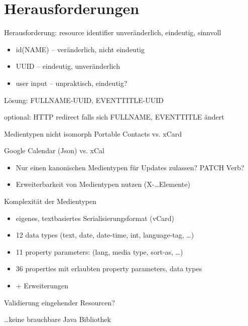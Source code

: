 \documentclass{beamer}
\begin{document}
\section{Herausforderungen}

\begin{frame}{Herausforderung: resource identifier}
  unveränderlich, eindeutig, sinnvoll
  \begin{itemize}
  \item id(NAME) -- veränderlich, nicht eindeutig
  \item UUID -- eindeutig, unveränderlich
  \item user input -- unpraktisch, eindeutig?
  \end{itemize}
  Lösung: FULLNAME-UUID, EVENTTITLE-UUID

  optional: HTTP redirect falls sich FULLNAME, EVENTTITLE ändert
\end{frame}

\begin{frame}{Medientypen nicht isomorph}
  Portable Contacts vs. xCard

  Google Calendar (Json) vs. xCal

  \begin{itemize}
  \item Nur einen kanonischen Medientypen für Updates zulassen? PATCH Verb?
  \item Erweiterbarkeit von Medientypen nutzen (X-\ldots Elemente)
  \end{itemize}
\end{frame}

\begin{frame}{Komplexität der Medientypen}
  \begin{itemize}
  \item eigenes, textbasiertes Serialisierungsformat (vCard)
  \item 12 data types (text, date, date-time, int, language-tag, \ldots)
  \item 11 property parameters: (lang, media type, sort-as, \ldots)
  \item 36 properties mit erlaubten property parameters, data types
  \item + Erweiterungen
  \end{itemize}
  Validierung eingehender Resourcen?

  \ldots keine brauchbare Java Bibliothek
\end{frame}
\end{document}

